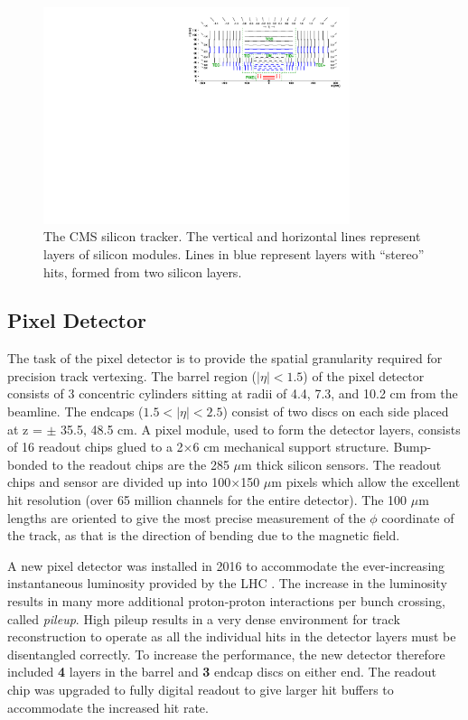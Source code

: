 \begin{figure}
\centering
\includegraphics[width=0.8\textwidth]{figs/TrackerLayoutNew.pdf}
\caption[The CMS silicon tracker]{The CMS silicon tracker. The vertical and horizontal lines represent layers of silicon modules. Lines in blue represent layers with ``stereo'' hits, formed from two silicon layers.}
\label{fig:tracker}
\end{figure}

\subsection{Pixel Detector}

The task of the pixel detector is to provide the spatial granularity required for precision track vertexing. The barrel region ($|\eta|<1.5$) of the pixel detector consists of 3 concentric cylinders sitting at radii of 4.4, 7.3, and 10.2 cm from the beamline. The endcaps ($1.5<|\eta|<2.5$) consist of two discs on each side placed at z = $\pm$ 35.5, 48.5 cm. A pixel module, used to form the detector layers, consists of 16 readout chips glued to a 2$\times$6 cm mechanical support structure. Bump-bonded to the readout chips are the 285 $\mu$m thick silicon sensors. The readout chips and sensor are divided up into 100$\times$150 $\mu$m pixels which allow the excellent hit resolution (over 65 million channels for the entire detector). The 100 $\mu$m lengths are oriented to give the most precise measurement of the $\phi$ coordinate of the track, as that is the direction of bending due to the magnetic field.  

A new pixel detector was installed in 2016 to accommodate the ever-increasing instantaneous luminosity provided by the LHC \cite{newpixel}. The increase in the luminosity results in many more additional proton-proton interactions per bunch crossing, called \textit{pileup}.  High pileup results in a very dense environment for track reconstruction to operate as all the individual hits in the detector layers must be disentangled correctly. To increase the performance, the new detector therefore included \textbf{4} layers in the barrel and \textbf{3} endcap discs on either end. The readout chip was upgraded to fully digital readout to give larger hit buffers to accommodate the increased hit rate.

